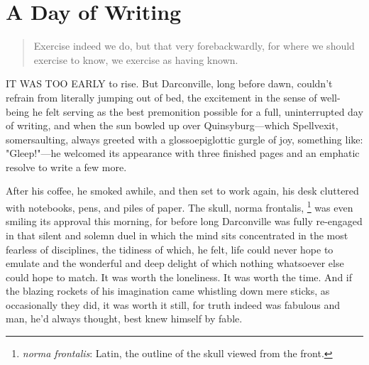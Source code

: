 ﻿\chapter{A Day of Writing}
 
\begin{quotation} 
  Exercise indeed we do, but that very forebackwardly,
  for where we should exercise to know, we exercise as having known.
\end{quotation}
\vspace{0.2cm}
 
 
  IT WAS TOO EARLY to rise. But Darconville, long before dawn, couldn't refrain
from literally jumping out of bed, the excitement in the sense of well-being he
felt serving as the best premonition 
possible for a full, uninterrupted day of writing, and when the sun bowled up 
over Quinsyburg---which Spellvexit, somersaulting, 
always greeted with a glossoepiglottic 
gurgle 
of joy, something
like: "Gleep!"---he welcomed its appearance with three finished pages and an
emphatic resolve to write a few more.

  After his coffee, he smoked awhile, and then set to work again, his desk
cluttered with notebooks, pens, and piles of paper. The skull, norma frontalis,
\footnote{ \textit{norma frontalis}: Latin, the outline of the skull viewed from
  the front.}
was even smiling its approval this morning, for before long Darconville was
fully re-engaged in that silent and solemn duel in which the mind sits
concentrated in the most fearless of disciplines, the tidiness of which, he
felt, life could never hope to emulate and the wonderful and deep delight of
which nothing whatsoever else could hope to match. It was worth the loneliness.
It was worth the time. And if the blazing rockets of his imagination came
whistling down mere sticks, as occasionally they did, it was worth it still, for
truth indeed was fabulous and man, he'd always thought, best knew himself by
fable.

